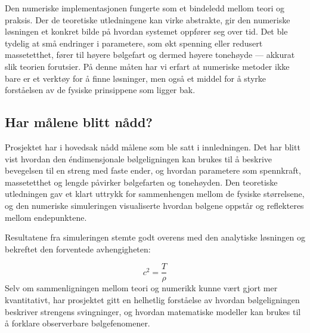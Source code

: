 Den numeriske implementasjonen fungerte som et bindeledd mellom teori og praksis. Der de teoretiske utledningene kan virke abstrakte, gir den numeriske løsningen et konkret bilde 
på hvordan systemet oppfører seg over tid. Det ble tydelig at små endringer i parametere, som økt spenning eller redusert massetetthet, fører til høyere bølgefart og dermed høyere tonehøyde — akkurat slik teorien forutsier. 
På denne måten har vi erfart at numeriske metoder ikke bare er et verktøy for å finne løsninger, men også et middel for å styrke forståelsen av de fysiske prinsippene som ligger bak.

\subsection{Har målene blitt nådd?}

Prosjektet har i hovedsak nådd målene som ble satt i innledningen. 
Det har blitt vist hvordan den éndimensjonale bølgeligningen kan brukes til å beskrive bevegelsen til en streng med faste ender, 
og hvordan parametere som spennkraft, massetetthet og lengde påvirker bølgefarten og tonehøyden. 
Den teoretiske utledningen gav et klart uttrykk for sammenhengen mellom de fysiske størrelsene, 
og den numeriske simuleringen visualiserte hvordan bølgene oppstår og reflekteres mellom endepunktene.  

Resultatene fra simuleringen stemte godt overens med den analytiske løsningen og bekreftet den forventede avhengigheten:

\begin{equation*}
  c^2 = \frac{T}{\rho}
\end{equation*}
Selv om sammenligningen mellom teori og numerikk kunne vært gjort mer kvantitativt, 
har prosjektet gitt en helhetlig forståelse av hvordan bølgeligningen beskriver strengens svingninger, 
og hvordan matematiske modeller kan brukes til å forklare observerbare bølgefenomener.



